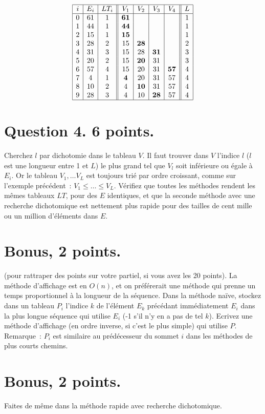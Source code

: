 \documentclass[a4paper]{article}
\begin{document}
\begin{center}
$$
\begin{array}{|c|c|c||c|c|c|c||c|}
\hline
i & E_i & LT_i & V_1 & V_2 & V_3 & V_4 & L \\
\hline
0 & 61 & 1 & {\bf 61} & & & & 1 \\
1 & 44 & 1 & {\bf 44} & & & & 1 \\
2 & 15 & 1 & {\bf 15} & & & & 1 \\
3 & 28 & 2 & 15 & {\bf 28}  & & & 2 \\
4 & 31 & 3 & 15 & 28  & {\bf 31} & & 3 \\
5 & 20 & 2 & 15 & {\bf 20}  & 31 & & 3 \\
6 & 57 & 4 & 15 & 20  & 31 & {\bf 57} & 4 \\
7 & 4 & 1 & {\bf 4} & 20  & 31 & 57 & 4 \\
8 & 10 & 2 & 4 & {\bf 10}  & 31 & 57 & 4 \\
9 & 28 & 3 & 4 & 10  & {\bf 28} & 57 & 4 \\
\hline
\end{array}
$$
\end{center}

\section*{Question 4. 6 points.} Cherchez $l$ par dichotomie dans le tableau $V$.
Il faut trouver dans $V$ l'indice $l$ ($l$ est une longueur entre 1 et $L$) le plus grand tel que $V_l$ soit inf\'erieure ou \'egale \`a $E_i$.
Or le tableau $V_1, \ldots V_L$ est toujours  tri\'e par ordre croissant, comme sur l'exemple pr\'ec\'edent~:
$V_1\le  \ldots \le  V_L$.
V\'erifiez que toutes les  m\'ethodes rendent les m\^emes tableaux $LT$, pour des $E$ identiques, et que la seconde m\'ethode avec une recherche dichotomique est 
nette\-ment plus rapide pour des tailles de cent mille ou un million d'\'el\'ements dans $E$.

\section*{Bonus, 2 points.} (pour rattraper des points sur votre partiel, si vous avez les 20 points). La m\'ethode d'affichage est en $O(n)$, et 
on pr\'ef\'ererait une m\'ethode qui prenne un temps proportionnel \`a la longueur de la s\'equence. 
Dans la m\'ethode na\"ive, stockez dans un tableau $P_i$ l'indice $k$ de l'\'el\'ement $E_k$ pr\'ec\'edant
imm\'ediatement $E_i$ dans la plus longue s\'equence qui utilise $E_i$ (-1 s'il n'y en a pas de tel $k$). 
Ecrivez une m\'ethode d'affichage (en ordre inverse, si c'est le plus simple) qui utilise $P$. Remarque~: $P_i$ est similaire au pr\'ed\'ecesseur 
du sommet $i$
dans les m\'ethodes de plus courts chemins.

\section*{Bonus, 2 points.} Faites de m\^eme dans la m\'ethode rapide avec recherche dichotomique.
\end{document}
